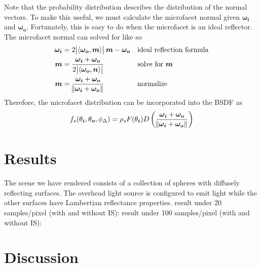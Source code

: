 \documentclass[12pt]{article}
\DeclarePairedDelimiter\ip{\langle }{\rangle}
\begin{document}
Note that the probability distribution describes the distribution of the normal vectors.
To make this useful, we must calculate the microfacet normal given \(\bm{\omega_i}\) and \(\bm{\omega_o}\).
Fortunately, this is easy to do when the microfacet is an ideal reflector.
The microfacet normal can solved for like so
\begin{align*}
  \bm{\omega_i} &= 2\abs{\ip{\bm{\omega_o}, \bm m}}\bm m-  \bm{\omega_o} && \text{ideal reflection formula}\\
  \bm m &= \frac{\bm{\omega_i} + \bm{\omega_o}}{2\abs{\ip{\bm{\omega_o}, \bm n}}} && \text{solve for \(\bm m\)}\\
  \bm m &= \frac{\bm{\omega_i} + \bm{\omega_o}}{\norm{\bm{\omega_i} + \bm{\omega_o}}} && \text{normalize}
\end{align*}
Therefore, the microfacet distribution can be incorporated into the BSDF as
\[f_s(\theta_{\bm i}, \theta_{\bm o}, \phi_\Delta) = \rho_sF(\theta_{\bm i})D\del{\frac{\bm{\omega_i} + \bm{\omega_o}}{\norm{\bm{\omega_i} + \bm{\omega_o}}}}\]
\section{Results}
The scene we have rendered consists of a collection of spheres with diffusely reflecting surfaces. The overhead light source is configured to emit light while the other surfaces have Lambertian reflectance properties.\newline
result under 20 samples/pixel (with and without IS):\newline 
result under 100 samples/pixel (with and without IS):\newline 

\section{Discussion}
\end{document}
